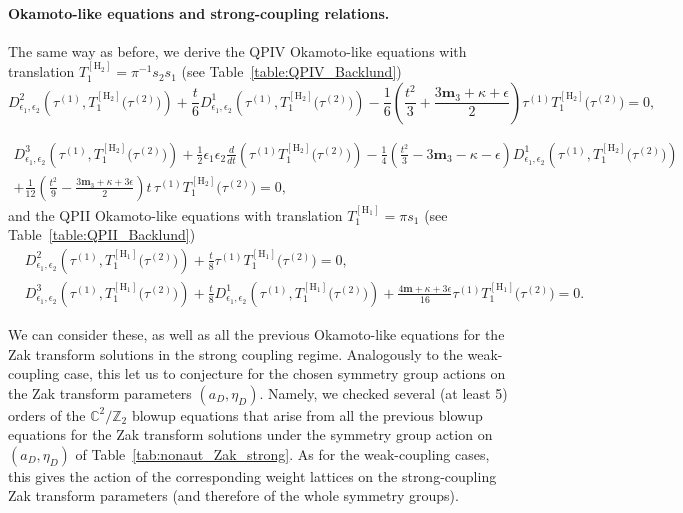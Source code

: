 \documentclass[12pt,a4paper]{article}
\numberwithin{equation}{section}
\newcommand{\D}{\scriptscriptstyle{D}}
\begin{document}
\paragraph{Okamoto-like equations and strong-coupling relations.}
The same way as before, we derive the QPIV Okamoto-like equations with translation $T_1^{[\mathrm{H_2}]}=\pi^{-1}s_2s_1$ (see Table~\ref{table:QPIV_Backlund})
\begin{equation}
D^2_{\epsilon_1,\epsilon_2}\left(\tau^{(1)},T_1^{[\mathrm{H_2}]}\big(\tau^{(2)}\big)\right)+\frac{t}6D^1_{\epsilon_1,\epsilon_2}\left(\tau^{(1)},T_1^{[\mathrm{H_2}]}\big(\tau^{(2)}\big)\right)-\frac16\left(\frac{t^2}3+\frac{3\boldsymbol{m}_3+\kappa+\epsilon}{2}\right)\tau^{(1)}T_1^{[\mathrm{H_2}]}\big(\tau^{(2)}\big)=0,
\end{equation}

\vspace{-0.7cm}

\begin{multline}
D^3_{\epsilon_1,\epsilon_2}\left(\tau^{(1)},T_1^{[\mathrm{H_2}]}\big(\tau^{(2)}\big)\right)+\frac12\epsilon_1\epsilon_2\frac{d}{dt}\left(\tau^{(1)}T_1^{[\mathrm{H_2}]}\big(\tau^{(2)}\big)\right)-\frac14\left(\frac{t^2}3-3\boldsymbol{m}_3-\kappa-\epsilon\right)D^1_{\epsilon_1,\epsilon_2}\left(\tau^{(1)},T_1^{[\mathrm{H_2}]}\big(\tau^{(2)}\big)\right)\\+\frac1{12}\left(\frac{t^2}9-\frac{3\boldsymbol{m}_3+\kappa+3\epsilon}2\right)t\,\tau^{(1)}T_1^{[\mathrm{H_2}]}\big(\tau^{(2)}\big)=0,
\end{multline}
and the QPII Okamoto-like equations with translation $T_1^{[\mathrm{H_1}]}=\pi s_1$ (see Table~\ref{table:QPII_Backlund})
\begin{align}
&D^2_{\epsilon_1,\epsilon_2}\left(\tau^{(1)},T_1^{[\mathrm{H_1}]}\big(\tau^{(2)}\big)\right)+\frac{t}8\tau^{(1)}T_1^{[\mathrm{H_1}]}\big(\tau^{(2)}\big)=0,\\
&D^3_{\epsilon_1,\epsilon_2}\left(\tau^{(1)},T_1^{[\mathrm{H_1}]}\big(\tau^{(2)}\big)\right)+\frac{t}8D^1_{\epsilon_1,\epsilon_2}\left(\tau^{(1)},T_1^{[\mathrm{H_1}]}\big(\tau^{(2)}\big)\right)+\frac{4\boldsymbol{m}+\kappa+3\epsilon}{16}\tau^{(1)}T_1^{[\mathrm{H_1}]}\big(\tau^{(2)}\big)=0.
\end{align}

We can consider these, as well as all the previous Okamoto-like equations for the Zak transform solutions in the strong coupling regime. Analogously to the weak-coupling case, this let us to conjecture for the chosen symmetry group actions on the Zak transform parameters $(a_{\D},\eta_{\D})$. Namely, we checked several (at least 5) orders of the $\mathbb{C}^2/\mathbb{Z}_2$ blowup equations that arise from all the previous blowup equations for the Zak transform solutions under the symmetry group action on $(a_{\D},\eta_{\D})$ of Table~\ref{tab:nonaut_Zak_strong}. As for the weak-coupling cases, this gives the action of the corresponding weight lattices on the strong-coupling Zak transform parameters (and therefore of the whole symmetry groups).
\end{document}
